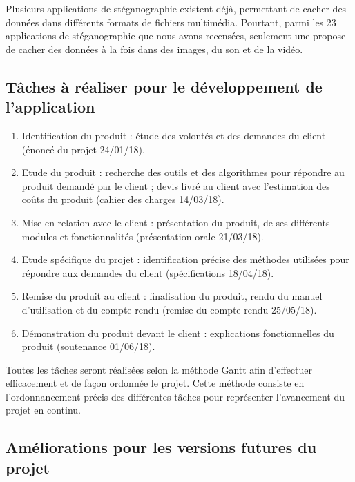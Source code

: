 \documentclass[11pt]{article}
\begin{document}
Plusieurs applications de stéganographie existent déjà, permettant de cacher des
données dans différents formats de fichiers multimédia. Pourtant, parmi les 23
applications de stéganographie que nous avons recensées, seulement une 
propose de cacher des données à la fois dans des images, du son et de la vidéo.

\subsection{Tâches à réaliser pour le développement de l'application}

\footnotesize
\begin {enumerate}
\item Identification du produit : étude des volontés et des demandes du client
    (énoncé du projet 24/01/18).
\item Etude du produit : recherche des outils et des algorithmes pour répondre
    au produit demandé par le client ; devis livré au client avec l'estimation
    des coûts du produit (cahier des charges 14/03/18).
\item Mise en relation avec le client : présentation du produit, de ses
    différents modules et fonctionnalités (présentation orale 21/03/18).
\item Etude spécifique du projet : identification précise des méthodes utilisées
    pour répondre aux demandes du client (spécifications 18/04/18).
\item Remise du produit au client : finalisation du produit, rendu du manuel
    d'utilisation et du compte-rendu (remise du compte rendu 25/05/18).
\item Démonstration du produit devant le client : explications fonctionnelles du
    produit (soutenance 01/06/18).
\end{enumerate}

Toutes les tâches seront réalisées selon la méthode Gantt afin d'effectuer 
efficacement et de façon ordonnée le projet. Cette méthode consiste en 
l'ordonnancement précis des différentes tâches pour représenter l'avancement 
du projet en continu. 
\small

\subsection{Améliorations pour les versions futures du projet}
\end{document}
